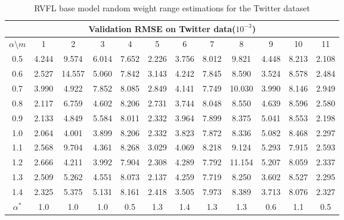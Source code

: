 \documentclass{article}
\begin{document}
\begin{table}[H]
\footnotesize 
\centering
\caption{RVFL base model random weight range estimations for the Twitter dataset}
\label{Talbe_RVFLE1}
\begin{tabular}{c|ccccccccccc}\hline
  \multicolumn{12}{c}{Validation RMSE on Twitter data($10^{-3}$)} \\\hline
\multicolumn{1}{c|}{$\alpha \setminus m$} & \multicolumn{1}{c}{1} & \multicolumn{1}{c}{2} & \multicolumn{1}{c}{3} & \multicolumn{1}{c}{4} & \multicolumn{1}{c}{5} & \multicolumn{1}{c}{6} & \multicolumn{1}{c}{7} & \multicolumn{1}{c}{8} & \multicolumn{1}{c}{9} & \multicolumn{1}{c}{10} & \multicolumn{1}{c}{11} \\ \hline
0.5 & 4.244 & 9.574  & 6.014 & 7.652 & 2.226 & 3.756 & 8.012 & 9.821  & 4.448 & 8.213 & 2.108 \\
0.6 & 2.527 & 14.557 & 5.060 & 7.842 & 3.143 & 4.242 & 7.845 & 8.590  & 3.524 & 8.578 & 2.484 \\
0.7 & 3.990 & 4.922  & 7.852 & 8.085 & 2.849 & 4.141 & 7.749 & 10.030 & 3.990 & 8.146 & 2.949 \\
0.8 & 2.117 & 6.759  & 4.602 & 8.206 & 2.731 & 3.744 & 8.048 & 8.550  & 4.639 & 8.596 & 2.580 \\
0.9 & 2.133 & 4.849  & 5.584 & 8.011 & 2.332 & 3.964 & 7.899 & 8.375  & 5.041 & 8.553 & 2.198 \\
1.0 & 2.064 & 4.001  & 3.899 & 8.206 & 2.332 & 3.823 & 7.872 & 8.336  & 5.082 & 8.468 & 2.297 \\
1.1 & 2.568 & 9.704  & 4.361 & 8.268 & 3.029 & 4.069 & 8.218 & 9.124  & 5.293 & 7.915 & 2.593 \\
1.2 & 2.666 & 4.211  & 3.992 & 7.904 & 2.308 & 4.289 & 7.792 & 11.154 & 5.207 & 8.059 & 2.337 \\
1.3 & 2.509 & 5.262  & 4.551 & 8.073 & 2.137 & 4.259 & 7.719 & 8.250  & 3.602 & 8.527 & 2.295 \\
1.4 & 2.325 & 5.375  & 5.131 & 8.161 & 2.418 & 3.505 & 7.973 & 8.389  & 3.713 & 8.076 & 2.327 \\\hline
$\alpha^*$& 1.0 & 1.0 & 1.0 & 0.5 & 1.3 & 1.4 & 1.3 & 1.3 & 0.6 & 1.1 & 0.5  \\ \hline
\end{tabular}
\end{table}
\end{document}

